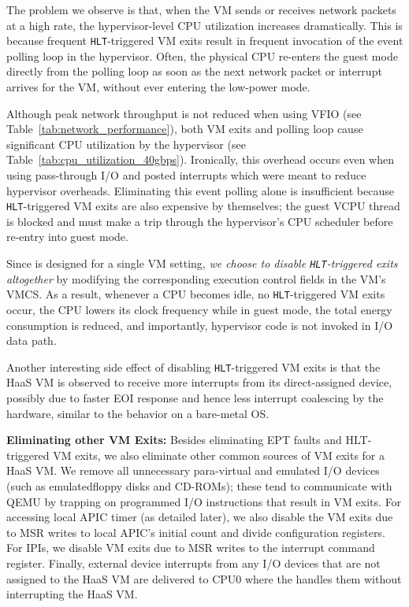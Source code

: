 The problem we observe is that, when the VM sends or receives network packets
at a high rate, the hypervisor-level CPU utilization increases
dramatically. This is because frequent {\tt HLT}-triggered VM exits
result in frequent invocation of the event polling loop in the hypervisor.
Often, the physical CPU re-enters the guest mode directly
from the polling loop as soon as the next network packet
or interrupt arrives for the VM, without ever entering the low-power mode.

Although peak network throughput is not reduced when
using VFIO (see Table~\ref{tab:network_performance}),
both VM exits and polling loop cause significant
CPU utilization by the hypervisor
(see Table~\ref{tab:cpu_utilization_40gbps}).
Ironically, this overhead occurs even when using pass-through I/O and
posted interrupts which were meant to reduce hypervisor overheads.
Eliminating this event polling alone is insufficient because {\tt HLT}-triggered VM exits
are also expensive by themselves; the guest VCPU thread is blocked and
must make a trip through the hypervisor's CPU scheduler before
re-entry into guest mode.

Since \na is designed for a single VM setting, {\em we choose to
disable {\tt HLT}-triggered exits altogether}
by modifying the corresponding execution control fields in the VM's VMCS.
As a result, whenever a CPU becomes idle, no {\tt HLT}-triggered
VM exits occur, the CPU lowers its clock frequency while in guest mode,
the total energy consumption is reduced, and importantly,
hypervisor code is not invoked in I/O data path.

Another interesting side effect of disabling {\tt HLT}-triggered VM exits
is that the HaaS VM is observed to receive more interrupts
from its direct-assigned device, possibly due to
faster EOI response and hence less interrupt coalescing by
the hardware, similar to the behavior on a bare-metal OS.

{\bf Eliminating other VM Exits:}
Besides eliminating EPT faults and HLT-triggered VM exits, we 
also eliminate other common sources of VM exits for a HaaS VM.
We remove all unnecessary para-virtual and emulated I/O devices 
(such as emulatedfloppy disks and CD-ROMs); these
tend to communicate with QEMU by trapping on programmed I/O instructions
that result in VM exits.
For accessing local APIC timer (as detailed later), 
we also disable the VM exits due to MSR
writes to local APIC's initial count and divide configuration
registers. For IPIs, we disable VM exits due to MSR writes to
the interrupt command register.  Finally, external device interrupts
from any I/O devices that are not assigned to the HaaS VM
are delivered to CPU0 where the \na handles them without
interrupting the HaaS VM.


